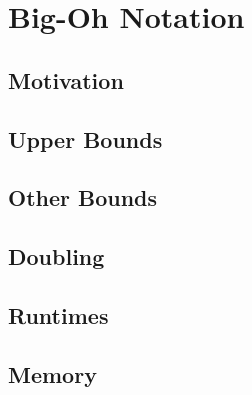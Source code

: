 \chapter{Big-Oh Notation}\label{ch:BigOh}

\section{Motivation}\label{sec:bigoh-motivation}

\section{Upper Bounds}\label{sec:bigoh-notation}

\section{Other Bounds}\label{sec:bigoh-bounds}

\section{Doubling}\label{sec:bigoh-doubling}

\section{Runtimes}\label{sec:bigoh-runtimes}

\section{Memory}\label{sec:bigoh-memory}